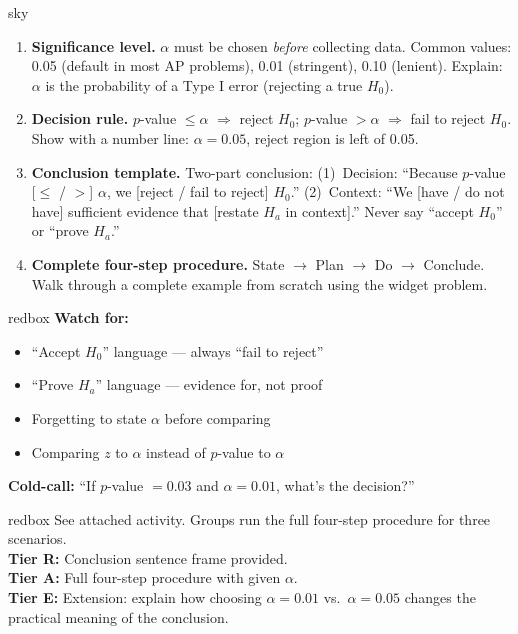 \documentclass[10pt]{article}
\begin{document}
\begin{skillbox}[Lesson]{sky}
    \begin{enumerate}[leftmargin=1.4em, label=\arabic*.]
        \item \textbf{Significance level.} $\alpha$ must be chosen \emph{before} collecting data.
              Common values: 0.05 (default in most AP problems), 0.01 (stringent), 0.10 (lenient).
              Explain: $\alpha$ is the probability of a Type I error (rejecting a true $H_0$).

        \item \textbf{Decision rule.}
              $p$-value $\le \alpha$ $\Rightarrow$ reject $H_0$;
              $p$-value $> \alpha$ $\Rightarrow$ fail to reject $H_0$.
              Show with a number line: $\alpha=0.05$, reject region is left of 0.05.

        \item \textbf{Conclusion template.} Two-part conclusion:
              (1)~Decision: ``Because $p$-value [$ \le$ / $>$] $\alpha$, we [reject / fail to reject] $H_0$.''
              (2)~Context: ``We [have / do not have] sufficient evidence that [restate $H_a$ in context].''
              Never say ``accept $H_0$'' or ``prove $H_a$.''

        \item \textbf{Complete four-step procedure.} State $\to$ Plan $\to$ Do $\to$ Conclude.
              Walk through a complete example from scratch using the widget problem.
    \end{enumerate}
\end{skillbox}

\begin{skillbox}{redbox}
    \textbf{Watch for:}
    \begin{itemize}[leftmargin=1.2em]
        \item ``Accept $H_0$'' language --- always ``fail to reject''
        \item ``Prove $H_a$'' language --- evidence for, not proof
        \item Forgetting to state $\alpha$ before comparing
        \item Comparing $z$ to $\alpha$ instead of $p$-value to $\alpha$
    \end{itemize}
    \textbf{Cold-call:} ``If $p$-value $= 0.03$ and $\alpha=0.01$, what's the decision?''
\end{skillbox}

\begin{skillbox}{redbox}
    See attached activity. Groups run the full four-step procedure for three scenarios.\\[4pt]
    \textbf{Tier R:} Conclusion sentence frame provided.\\
    \textbf{Tier A:} Full four-step procedure with given $\alpha$.\\
    \textbf{Tier E:} Extension: explain how choosing $\alpha=0.01$ vs.\ $\alpha=0.05$ changes
    the practical meaning of the conclusion.
\end{skillbox}
\end{document}
